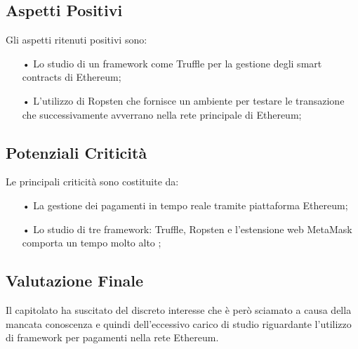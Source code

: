 \subsection{Aspetti Positivi}

Gli aspetti ritenuti positivi sono: 
\begin{itemize}

\item[•] Lo studio di un framework come Truffle per la gestione degli smart contracts di Ethereum;
\item[•] L'utilizzo di Ropsten che fornisce un ambiente per testare le transazione che successivamente avverrano nella rete principale di Ethereum;

\end{itemize}

\subsection{Potenziali Criticità}
Le principali criticità sono costituite da: 
\begin{itemize}

\item[•]La gestione dei pagamenti in tempo reale tramite piattaforma Ethereum;

\item[•] Lo studio di tre framework: Truffle, Ropsten e l'estensione web MetaMask comporta un tempo molto alto ;

\end{itemize}


\subsection{Valutazione Finale}
Il capitolato ha suscitato del discreto interesse che è però sciamato a causa della mancata conoscenza e quindi dell'eccessivo carico di studio riguardante l'utilizzo di framework per pagamenti nella rete Ethereum. 